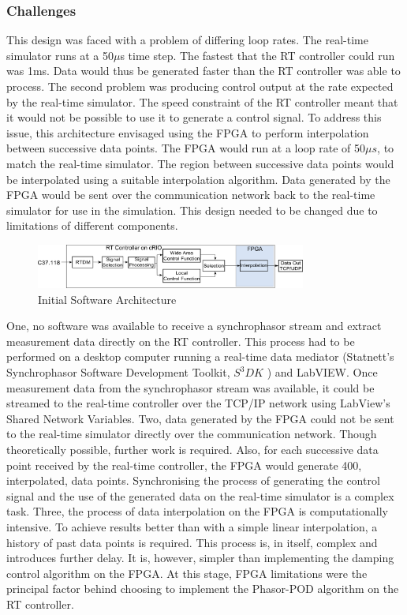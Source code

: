 \documentclass[conference]{IEEEtran}
\begin{document}
\subsubsection*{Challenges} This design was faced with a problem of differing loop rates. The real-time simulator runs at a 50$\mu$s time step. The fastest that the RT controller could run was 1ms. Data would thus be generated faster than the RT controller was able to process. The second problem was producing control output at the rate expected by the real-time simulator. The speed constraint of the RT controller meant that it would not be possible to use it to generate a control signal. To address this issue, this architecture envisaged using the FPGA to perform interpolation between successive data points. The FPGA would run at a loop rate of 50$\mu s$, to match the real-time simulator. The region between successive data points would be interpolated using a suitable interpolation algorithm. Data generated by the FPGA would be sent over the communication network back to the real-time simulator for use in the simulation. This design needed to be changed due to limitations of different components. 
\begin{figure}[h]
\centering
\includegraphics[width=3.5in]{InitialArch}
\vspace{-0.5em}
\caption{Initial Software Architecture}
\label{fig:InitialArch}
\end{figure}

One, no software was available to receive a synchrophasor stream and extract measurement data directly on the RT controller. This process had to be performed on a desktop computer running a real-time data mediator (Statnett's Synchrophasor Software Development Toolkit, $S^{3}DK$ \cite{SDK}) and LabVIEW. Once measurement data from the synchrophasor stream was available, it could be streamed to the real-time controller over the TCP/IP network using LabView's Shared Network Variables. Two, data generated by the FPGA could not be sent to the real-time simulator directly over the communication network. Though theoretically possible, further work is required. Also, for each successive data point received by the real-time controller, the FPGA would generate 400, interpolated, data points. Synchronising the process of generating the control signal and the use of the generated data on the real-time simulator is a complex task. Three, the process of data interpolation on the FPGA is computationally intensive. To achieve results better than with a simple linear interpolation, a history of past data points is required. This process is, in itself, complex and introduces further delay. It is, however, simpler than implementing the damping control algorithm on the FPGA. At this stage, FPGA limitations were the principal factor behind choosing to implement the Phasor-POD algorithm on the RT controller.
\end{document}
